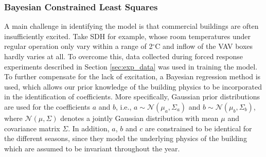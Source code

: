 \subsubsection{Bayesian Constrained Least Squares}
A main challenge in identifying the model is that commercial buildings are often insufficiently excited. Take SDH for example, whose room temperatures under regular operation only vary within a range of 2$^{\circ}$C and inflow of the VAV boxes hardly varies at all. To overcome this, data collected during forced response experiments described in Section \ref{sec:exp_data} was used in training the model. To further compensate for the lack of excitation, a Bayesian regression method is used, which allows our prior knowledge of the building physics to be incorporated in the identification of coefficients. More specifically, Gaussian prior distributions are used for the coefficients $a$ and $b$, i.e., $a \sim \mathcal{N}( \mu_a, \Sigma_a)$ and $b \sim \mathcal{N}( \mu_b, \Sigma_b)$, where $\mathcal{N}( \mu, \Sigma)$ denotes a jointly Gaussian distribution with mean $\mu$ and covariance matrix $\Sigma$. In addition, $a$, $b$ and $c$ are constrained to be identical for the different seasons, since they model the underlying physics of the building which are assumed to be invariant throughout the year. 

